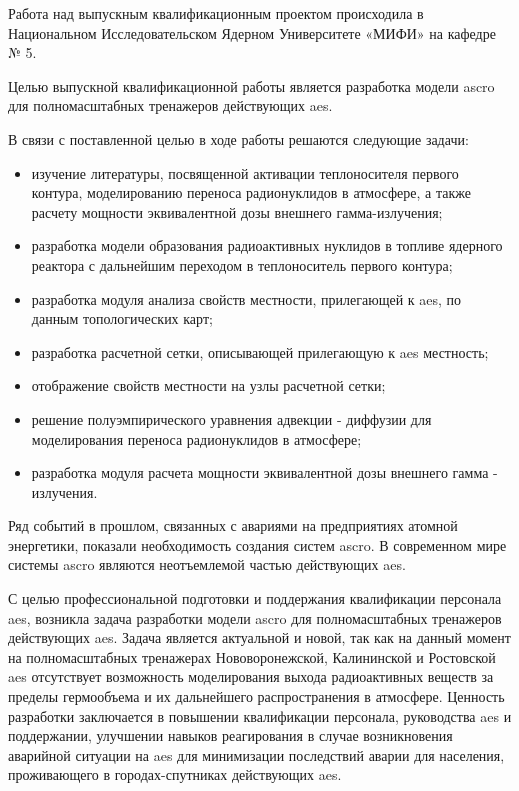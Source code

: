 
Работа над выпускным квалификационным проектом происходила в Национальном Исследовательском Ядерном Университете «МИФИ» 
на кафедре № 5.

Целью выпускной квалификационной работы является разработка модели \ac{ascro} для полномасштабных тренажеров действующих 
\ac{aes}.

В связи с поставленной целью в ходе работы решаются следующие задачи:

\begin{itemize}
	\item изучение литературы, посвященной активации теплоносителя первого контура, моделированию переноса радионуклидов 
	в атмосфере, а также расчету мощности эквивалентной дозы внешнего гамма-излучения;
	\item разработка модели образования радиоактивных нуклидов в топливе ядерного реактора с дальнейшим переходом в
		теплоноситель первого контура;
	\item разработка модуля анализа свойств местности, прилегающей к \ac{aes}, по данным топологических карт;
	\item разработка расчетной сетки, описывающей прилегающую к \ac{aes} местность;
	\item отображение свойств местности на узлы расчетной сетки;
	\item решение полуэмпирического уравнения адвекции - диффузии для моделирования переноса радионуклидов в атмосфере;
	\item разработка модуля расчета мощности эквивалентной дозы внешнего гамма - излучения.
\end{itemize}

Ряд событий в прошлом, связанных с авариями на предприятиях атомной энергетики, показали необходимость создания систем 
\ac{ascro}. В современном мире системы \ac{ascro} являются неотъемлемой частью действующих \ac{aes}. 

С целью профессиональной подготовки и поддержания квалификации персонала \ac{aes}, возникла задача разработки модели 
\ac{ascro} для полномасштабных тренажеров действующих \ac{aes}. Задача является актуальной и новой, так как на данный 
момент на полномасштабных тренажерах Нововоронежской, Калининской и Ростовской \ac{aes} отсутствует возможность 
моделирования выхода радиоактивных веществ за пределы гермообъема и их дальнейшего распространения в атмосфере. Ценность 
разработки заключается в повышении квалификации персонала, руководства \ac{aes} и поддержании, улучшении навыков 
реагирования в случае возникновения аварийной ситуации на \ac{aes} для минимизации последствий аварии для населения, 
проживающего в городах-спутниках действующих \ac{aes}.

